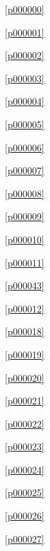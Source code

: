 ﻿



\noindent\figurename\ \ref{p000000}\dotfill\pageref{p000000}

\noindent\figurename\ \ref{p000001}\dotfill\pageref{p000001}

\noindent\figurename\ \ref{p000002}\dotfill\pageref{p000002}

\noindent\figurename\ \ref{p000003}\dotfill\pageref{p000003}

\noindent\figurename\ \ref{p000004}\dotfill\pageref{p000004}

\noindent\figurename\ \ref{p000005}\dotfill\pageref{p000005}

\noindent\figurename\ \ref{p000006}\dotfill\pageref{p000006}

\noindent\figurename\ \ref{p000007}\dotfill\pageref{p000007}

\noindent\figurename\ \ref{p000008}\dotfill\pageref{p000008}

\noindent\figurename\ \ref{p000009}\dotfill\pageref{p000009}

\noindent\figurename\ \ref{p000010}\dotfill\pageref{p000010}

\noindent\figurename\ \ref{p000011}\dotfill\pageref{p000011}

\noindent\figurename\ \ref{p000043}\dotfill\pageref{p000043}

\noindent\figurename\ \ref{p000012}\dotfill\pageref{p000012}

\noindent\figurename\ \ref{p000018}\dotfill\pageref{p000018}

\noindent\figurename\ \ref{p000019}\dotfill\pageref{p000019}

\noindent\figurename\ \ref{p000020}\dotfill\pageref{p000020}

\noindent\figurename\ \ref{p000021}\dotfill\pageref{p000021}

\noindent\figurename\ \ref{p000022}\dotfill\pageref{p000022}

\noindent\figurename\ \ref{p000023}\dotfill\pageref{p000023}

\noindent\figurename\ \ref{p000024}\dotfill\pageref{p000024}

\noindent\figurename\ \ref{p000025}\dotfill\pageref{p000025}

\noindent\figurename\ \ref{p000026}\dotfill\pageref{p000026}

\noindent\figurename\ \ref{p000027}\dotfill\pageref{p000027}

